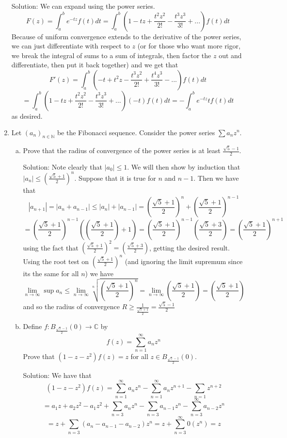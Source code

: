\documentclass[11pt]{article}
\newcommand{\C}{\mathbb{C}}
\begin{document}
\begin{enumerate}[(1)]
Solution: We can expand using the power series.
$$ F(z) = \int_a^b e^{-tz}f(t)dt = \int_a^b (1 - tz + \frac{t^2z^2}{2!} - \frac{t^3z^3}{3!} + ...) f(t)dt $$
Because of uniform convergence extends to the derivative of the power series, we can just differentiate with respect to $z$ (or for those who want more rigor, we break the integral of sums to a sum of integrals, then factor the $z$ out and differentiate, then put it back together) and we get that 
$$ F'(z) = \int_a^b (-t + t^2z - \frac{t^3z^2}{2!} + \frac{t^4z^3}{3!} - ...)f(t)dt  $$
$$ =\int_a^b \left(1 - tz + \frac{t^2z^2}{2!} - \frac{t^3z^3}{3!} + ...\right)(-t)f(t)dt = - \int_a^b e^{-tz}tf(t)dt $$
as desired.

\item Let $(a_n)_{n\in\mathbb{N}}$ be the Fibonacci sequence. Consider the power series $\sum a_nz^n$. 

\begin{enumerate}[(a)]
\item Prove that the radius of convergence of the power series is at least $\frac{\sqrt{5} - 1}{2}$.

Solution: Note clearly that $|a_0| \leq 1$. We will then show by induction that $|a_n| \leq \left(\frac{\sqrt{5} + 1}{2}\right)^n$. Suppose that it is true for $n$ and $n-1$. Then we have that 
$$ |a_{n+1}| = |a_n + a_{n-1}| \leq |a_n| + |a_{n-1}| = \left(\frac{\sqrt{5} + 1}{2}\right)^n + \left(\frac{\sqrt{5} + 1}{2}\right)^{n-1} $$
$$= \left(\frac{\sqrt{5} + 1}{2}\right)^{n-1}\left(\left(\frac{\sqrt{5} + 1}{2}\right) + 1\right) =  \left(\frac{\sqrt{5} + 1}{2}\right)^{n-1}\left(\frac{\sqrt{5} + 3}{2}\right) = \left(\frac{\sqrt{5} + 1}{2}\right)^{n + 1}$$ 
using the fact that $\left(\frac{\sqrt{5} + 1}{2}\right)^2 = \left(\frac{\sqrt{5} + 3}{2}\right)$, getting the desired result. Using the root test on $\left(\frac{\sqrt{5} + 1}{2}\right)^n$ (and ignoring the limit supremum since its the same for all $n$) we have 
$$ \lim_{n\to\infty}\sup a_n \leq \lim_{n\to\infty} \sqrt[n]{\left(\frac{\sqrt{5} + 1}{2}\right)^n} = \lim_{n \to \infty} \left(\frac{\sqrt{5} + 1}{2}\right) = \left(\frac{\sqrt{5} + 1}{2}\right) $$
and so the radius of convergence $R \geq \frac{1}{\frac{\sqrt{5} + 1}{2}} = \frac{\sqrt{5} - 1}{2}$

\item Define $f:B_{\frac{\sqrt{5} - 1}{2}}(0) \to \C$ by 
$$ f(z) = \sum_{n=1}^{\infty} a_nz^n $$
Prove that $(1 - z - z^2)f(z) = z$ for all $z \in B_{\frac{\sqrt{5}-1}{2}}(0)$.

Solution: We have that 
$$(1 - z - z^2)f(z) = \sum_{n=1}^{\infty} a_nz^n - \sum_{n=1}^{\infty}a_nz^{n+1} - \sum_{n=1}z^{n+2} $$
$$ = a_1z + a_2z^2 - a_1z^2 + \sum_{n=3}a_nz^n - \sum_{n=3}a_{n-1}z^n - \sum_{n=3}^{\infty}a_{n-2}z^n $$
$$ = z + \sum_{n=3}(a_n - a_{n-1} - a_{n-2})z^n = z + \sum_{n=3}^{\infty} 0(z^n) = z $$


\end{enumerate}
\end{enumerate}
\end{document}
